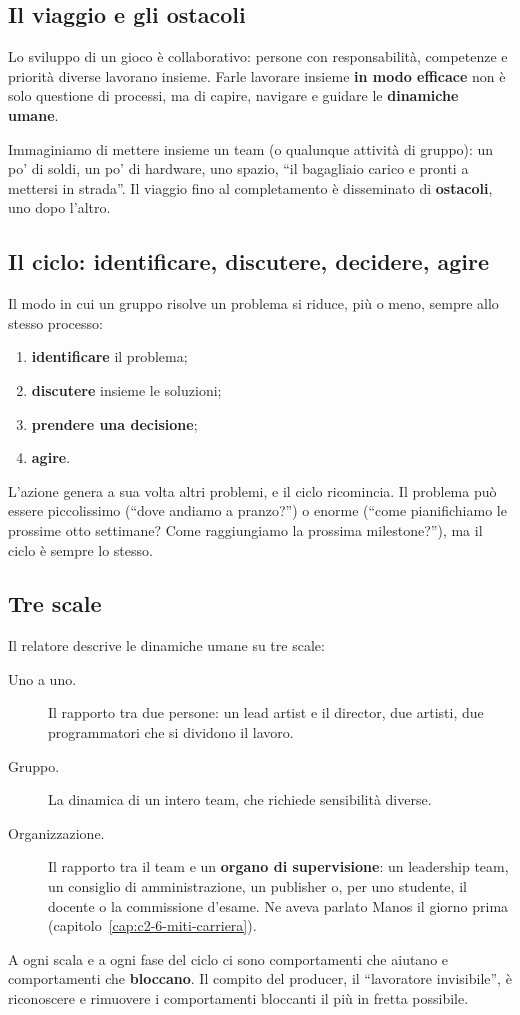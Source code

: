 \subsection{Il viaggio e gli ostacoli}

Lo sviluppo di un gioco è collaborativo: persone con responsabilità, competenze e
priorità diverse lavorano insieme. Farle lavorare insieme \textbf{in modo efficace}
non è solo questione di processi, ma di capire, navigare e guidare le
\textbf{dinamiche umane}.

Immaginiamo di mettere insieme un team (o qualunque attività di gruppo): un po' di
soldi, un po' di hardware, uno spazio, ``il bagagliaio carico e pronti a mettersi
in strada''. Il viaggio fino al completamento è disseminato di
\textbf{ostacoli}, uno dopo l'altro.

\subsection{Il ciclo: identificare, discutere, decidere, agire}

Il modo in cui un gruppo risolve un problema si riduce, più o meno, sempre allo
stesso processo:
\begin{enumerate}
  \item \textbf{identificare} il problema;
  \item \textbf{discutere} insieme le soluzioni;
  \item \textbf{prendere una decisione};
  \item \textbf{agire}.
\end{enumerate}
L'azione genera a sua volta altri problemi, e il ciclo ricomincia. Il problema può
essere piccolissimo (``dove andiamo a pranzo?'') o enorme (``come pianifichiamo le
prossime otto settimane? Come raggiungiamo la prossima milestone?''), ma il ciclo è
sempre lo stesso.

\subsection{Tre scale}

Il relatore descrive le dinamiche umane su tre scale:
\begin{description}
  \item[Uno a uno.] Il rapporto tra due persone: un lead artist e il director, due
        artisti, due programmatori che si dividono il lavoro.
  \item[Gruppo.] La dinamica di un intero team, che richiede sensibilità diverse.
  \item[Organizzazione.] Il rapporto tra il team e un \textbf{organo di
        supervisione}: un leadership team, un consiglio di amministrazione, un
        publisher o, per uno studente, il docente o la commissione d'esame. Ne
        aveva parlato Manos il giorno prima (capitolo~\ref{cap:c2-6-miti-carriera}).
\end{description}
A ogni scala e a ogni fase del ciclo ci sono comportamenti che aiutano e
comportamenti che \textbf{bloccano}. Il compito del producer, il ``lavoratore
invisibile'', è riconoscere e rimuovere i comportamenti bloccanti il più in fretta
possibile.

